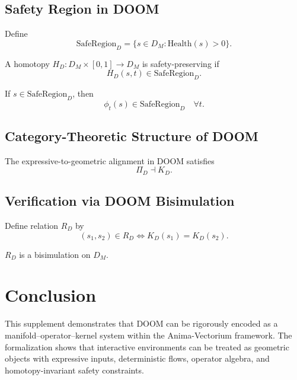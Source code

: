 \section{Safety Region in DOOM}

\begin{definition}
Define
\[
\mathrm{SafeRegion}_D = \{ s \in D_M : \mathrm{Health}(s) > 0 \}.
\]
\end{definition}

\begin{definition}
A homotopy $H_D : D_M \times [0,1] \to D_M$ is safety-preserving if
\[
H_D(s,t) \in \mathrm{SafeRegion}_D.
\]
\end{definition}

\begin{theorem}
If $s \in \mathrm{SafeRegion}_D$, then
\[
\phi_t(s) \in \mathrm{SafeRegion}_D \quad \forall t.
\]
\end{theorem}

\section{Category-Theoretic Structure of DOOM}

\begin{theorem}
The expressive-to-geometric alignment in DOOM satisfies
\[
\Pi_D \dashv K_D.
\]
\end{theorem}

\begin{center}
\end{center}

\section{Verification via DOOM Bisimulation}

\begin{definition}
Define relation $R_D$ by
\[
(s_1, s_2) \in R_D \iff K_D(s_1) = K_D(s_2).
\]
\end{definition}

\begin{theorem}
$R_D$ is a bisimulation on $D_M$.
\end{theorem}

\chapter*{Conclusion}

This supplement demonstrates that DOOM can be rigorously encoded as a
manifold–operator–kernel system within the Anima-Vectorium framework. The
formalization shows that interactive environments can be treated as geometric
objects with expressive inputs, deterministic flows, operator algebra, and
homotopy-invariant safety constraints.
